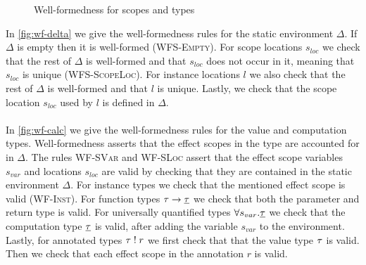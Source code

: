 {\begin{figure}[h]
\caption{Well-formedness for scopes and types}
\centering
{}
\end{figure}

In \cref{fig:wf-delta} we give the well-formedness rules for the static environment $\Delta$.
If $\Delta$ is empty then it is well-formed (\textsc{WFS-Empty}).
For scope locations $s_{loc}$ we check that the rest of $\Delta$ is well-formed and that $s_{loc}$ does not occur in it, meaning that $s_{loc}$ is unique (\textsc{WFS-ScopeLoc}).
For instance locations $l$ we also check that the rest of $\Delta$ is well-formed and that $l$ is unique.
Lastly, we check that the scope location $s_{loc}$ used by $l$ is defined in $\Delta$.
\\\\
In \cref{fig:wf-calc} we give the well-formedness rules for the value and computation types.
Well-formedness asserts that the effect scopes in the type are accounted for in $\Delta$.
The rules \textsc{WF-SVar} and \textsc{WF-SLoc} assert that the effect scope variables $s_{var}$ and locations $s_{loc}$ are valid by checking that they are contained in the static environment $\Delta$.
For instance types we check that the mentioned effect scope is valid (\textsc{WF-Inst}).
For function types $\tau \rightarrow \underline{\tau}$ we check that both the parameter and return type is valid.
For universally quantified types $\forall s_{var} . \underline{\tau}$ we check that the computation type $\underline{\tau}$ is valid, after adding the variable $s_{var}$ to the environment.
Lastly, for annotated types $\tau \; ! \; r$ we first check that that the value type $\tau$ is valid.
Then we check that each effect scope in the annotation $r$ is valid.

}
